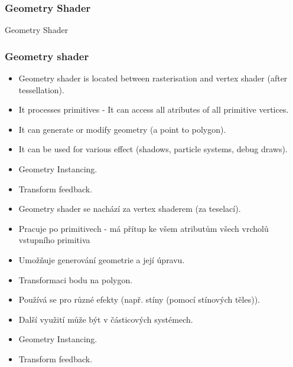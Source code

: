 \begin{frame}
\frametitle{Geometry Shader}
\begin{center}
\Huge {\color{white}Geometry Shader}
\end{center}
\end{frame}

\begin{frame}[fragile]
\frametitle{Geometry shader}
  \scriptsize
	\begin{itemize}
    \item Geometry shader is located between rasterisation and vertex shader (after tessellation).
	  \item It processes primitives - It can access all atributes of all primitive vertices.
    \item It can generate or modify geometry (a point to polygon).
    \item It can be used for various effect (shadows, particle systems, debug draws).
	  \item Geometry Instancing.
	  \item Transform feedback.
	\end{itemize}
	\begin{itemize}
	  \item Geometry shader se nachází za vertex shaderem (za teselací).
	  \item Pracuje po primitivech - má přítup ke všem atributům všech vrcholů vstupního primitiva
	  \item Umožňuje generování geometrie a její úpravu.
	  \item Transformaci bodu na polygon. 
	  \item Používá se pro různé efekty (např. stíny (pomocí stínových těles)).
	  \item Další využití může být v částicových systémech.
	  \item Geometry Instancing.
	  \item Transform feedback.
	\end{itemize}
\end{frame}

